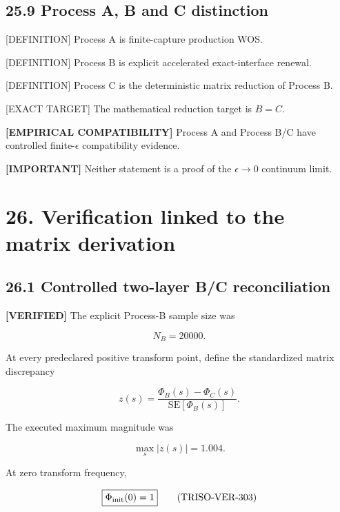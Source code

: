 \documentclass[11pt,a4paper]{article}
\begin{document}
\subsection*{25.9 Process A, B and C distinction}

[DEFINITION] Process A is finite-capture production WOS.

[DEFINITION] Process B is explicit accelerated exact-interface renewal.

[DEFINITION] Process C is the deterministic matrix reduction of Process B.

[EXACT TARGET] The mathematical reduction target is $B=C$.

\textbf{[EMPIRICAL COMPATIBILITY]} Process A and Process B/C have controlled finite-$\epsilon$ compatibility evidence.

\textbf{[IMPORTANT]} Neither statement is a proof of the $\epsilon\rightarrow0$ continuum limit.


\section*{26. Verification linked to the matrix derivation}

\subsection*{26.1 Controlled two-layer B/C reconciliation}

\textbf{[VERIFIED]} The explicit Process-B sample size was

\begin{equation}
N_B=20000.
\tag{TRISO-VER-300}
\label{eq:triso-ver-300}
\end{equation}

At every predeclared positive transform point, define the standardized matrix discrepancy

\begin{equation}
z(s)=
\frac{\Phi_B(s)-\Phi_C(s)}
{\mathrm{SE}[\Phi_B(s)]}.
\tag{TRISO-VER-301}
\label{eq:triso-ver-301}
\end{equation}

The executed maximum magnitude was

\begin{equation}
\boxed{
\max_s|z(s)|=1.004.
}
\tag{TRISO-VER-302}
\label{eq:triso-ver-302}
\end{equation}

At zero transform frequency,

\begin{equation}
\boxed{
\Phi_{\rm init}(0)=1
}
\tag{TRISO-VER-303}
\label{eq:triso-ver-303}
\end{equation}
\end{document}

